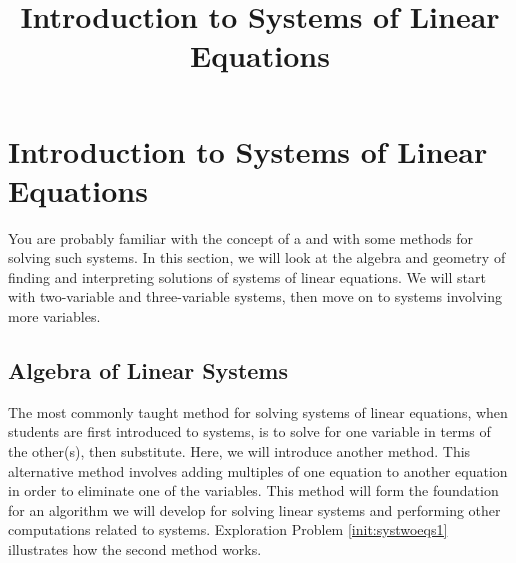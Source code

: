 \documentclass{ximera}
\title{Introduction to Systems of Linear Equations} \license{CC BY-NC-SA 4.0}
\begin{document}
\begin{abstract}
\end{abstract}
\maketitle
\section*{Introduction to Systems of Linear Equations}

You are probably familiar with the concept of a  and with some methods for solving such systems.  In this section, we will look at the algebra and geometry of finding and interpreting solutions of systems of linear equations.  We will start with two-variable and three-variable systems, then move on to systems involving more variables.  

\subsection*{Algebra of Linear Systems}
The most commonly taught method for solving systems of linear equations, when students are first introduced to systems, is to solve for one variable in terms of the other(s), then substitute.  Here, we will introduce another method.  This alternative method involves adding multiples of one equation to another equation in order to eliminate one of the variables.  This method will form the foundation for an algorithm we will develop for solving linear systems and performing other computations related to systems.  Exploration Problem \ref{init:systwoeqs1} illustrates how the second method works.
\end{document}
